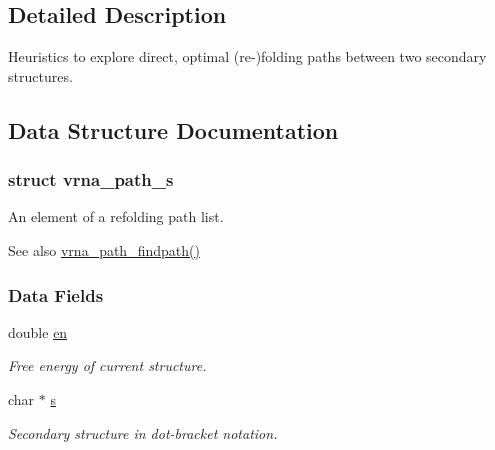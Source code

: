 \subsection{Detailed Description}
Heuristics to explore direct, optimal (re-\/)folding paths between two secondary structures. 



\subsection{Data Structure Documentation}
\label{structvrna__path__s}
\hypertarget{group__direct__paths_structvrna__path__s}{}
\subsubsection{struct vrna\+\_\+path\+\_\+s}
An element of a refolding path list. 

\begin{DoxySeeAlso}{See also}
\hyperlink{group__direct__paths_ga5e1f97f58adc65016a8df88802dc16b5}{vrna\+\_\+path\+\_\+findpath()} 
\end{DoxySeeAlso}
\subsubsection*{Data Fields}
\begin{DoxyCompactItemize}
\item 
double \hyperlink{group__direct__paths_ac25160bf31d28097358278f367e41227}{en}\hypertarget{group__direct__paths_ac25160bf31d28097358278f367e41227}{}\label{group__direct__paths_ac25160bf31d28097358278f367e41227}

\begin{DoxyCompactList}\small\item\em Free energy of current structure. \end{DoxyCompactList}\item 
char $\ast$ \hyperlink{group__direct__paths_a141b70a59cb81d10bc65bbb7a0f6db77}{s}\hypertarget{group__direct__paths_a141b70a59cb81d10bc65bbb7a0f6db77}{}\label{group__direct__paths_a141b70a59cb81d10bc65bbb7a0f6db77}

\begin{DoxyCompactList}\small\item\em Secondary structure in dot-\/bracket notation. \end{DoxyCompactList}\end{DoxyCompactItemize}


